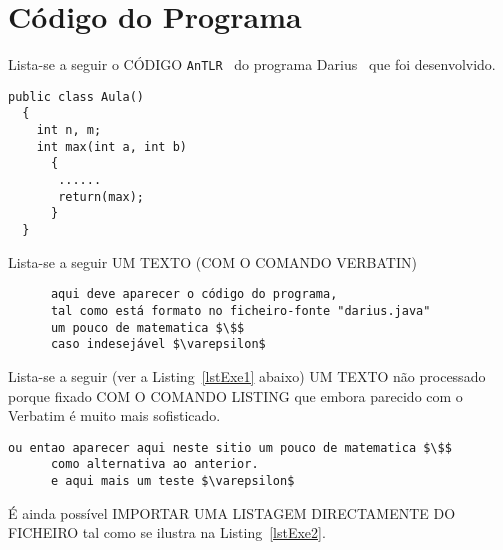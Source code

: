 \documentclass[11pt,a4paper]{report}%
\def\darius{\textsf{Darius}\xspace}
\def\antlr{\texttt{AnTLR}\xspace}
\begin{document}
\appendix %
\chapter{Código do Programa}

Lista-se a seguir o CÓDIGO \antlr~\cite{antlr:2016} do programa
\darius~\cite{maskin:1985} que foi desenvolvido.
\begin{verbatim}
public class Aula()
  {
    int n, m;
    int max(int a, int b)
      {
       ......
       return(max);
      }
  }
\end{verbatim}

Lista-se a seguir UM TEXTO (COM O COMANDO VERBATIN)
\begin{verbatim}
      aqui deve aparecer o código do programa,
      tal como está formato no ficheiro-fonte "darius.java"
      um pouco de matematica $\$$
      caso indesejável $\varepsilon$
\end{verbatim}


Lista-se a seguir (ver a Listing~\ref{lstExe1} abaixo) UM TEXTO não processado porque fixado COM O COMANDO LISTING 
que embora parecido com o Verbatim é muito mais sofisticado.

\begin{lstlisting}[caption={Exemplo de uma Listagem}, label={lstExe1}]
      ou entao aparecer aqui neste sitio um pouco de matematica $\$$
      como alternativa ao anterior.
      e aqui mais um teste $\varepsilon$
\end{lstlisting}

\newpage

É ainda possível IMPORTAR UMA LISTAGEM DIRECTAMENTE DO FICHEIRO tal como se ilustra na Listing~\ref{lstExe2}.




\end{document}

